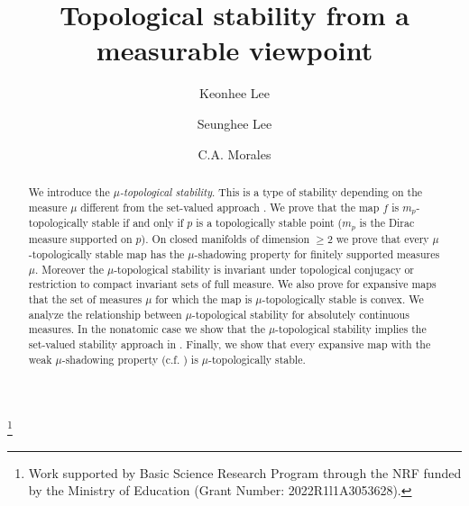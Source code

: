 \documentclass[11pt,letterpaper]{amsart}
\theoremstyle{plain}
\begin{document}
\title{Topological stability from a measurable viewpoint}




\author{Keonhee Lee}
\address{Department of Mathematics, Chungnam Ntional University, Daejeon 305-764, Republic of Korea.}

\author{Seunghee Lee}
\address{Department of Healthcare Data Science Center, Konyang University Hospital, Daejeon, Republic of  Korea }


\author{C.A. Morales}
\address{Instituto de Matem\'atica, Universidade Federal do Rio de Janeiro, P. O.
Box 68530, 21945-970 Rio de Janeiro, Brazil.}













\thanks{Work supported by Basic Science Research Program through the NRF funded by the Ministry of Education (Grant Number: 2022R1l1A3053628).}










\begin{abstract}
We introduce the {\em $\mu$-topological stability}. This is a type of stability depending on the measure $\mu$ different from the set-valued approach \cite{lm}.
We prove that the map $f$ is $m_p$-topologically stable
if and only if $p$ is a topologically stable point ($m_p$ is the Dirac measure supported on $p$).
On closed manifolds of dimension $\geq2$ we prove that
every $\mu$-topologically stable map has the $\mu$-shadowing property for finitely supported measures $\mu$.
Moreover the $\mu$-topological stability is invariant under topological conjugacy or restriction to compact invariant sets of full measure.
We also prove for expansive maps that the set of measures $\mu$ for which the map is $\mu$-topologically stable is convex.
We analyze the relationship between $\mu$-topological stability for absolutely continuous measures.
In the nonatomic case we show that the $\mu$-topological stability implies the set-valued stability approach in \cite{lm}.
Finally, we show that every expansive map with the weak $\mu$-shadowing property (c.f. \cite{lr}) is $\mu$-topologically stable.
\end{abstract}
\end{document}
